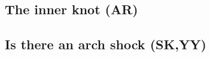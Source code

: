 \subsection{The inner knot (AR)}
\cite{Moran_2015}\cite{rudy2015}
\label{sec:knot}
\subsection{Is there an arch shock (SK,YY)}
